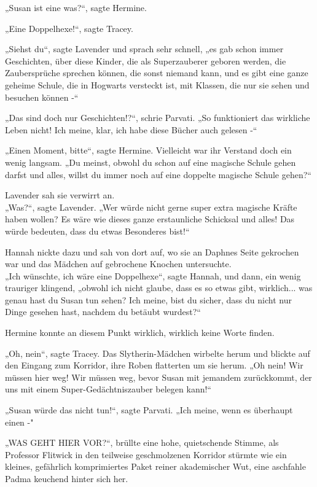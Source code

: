 {„Susan ist eine was?“, sagte Hermine.

„Eine Doppelhexe!“, sagte Tracey.

„Siehst du“, sagte Lavender und sprach sehr schnell, „es gab schon immer Geschichten, über diese Kinder, die als Superzauberer geboren werden, die Zaubersprüche sprechen können, die sonst niemand kann, und es gibt eine ganze geheime Schule, die in Hogwarts versteckt ist, mit Klassen, die nur sie sehen und besuchen können -“

„Das sind doch nur Geschichten!?“, schrie Parvati. „So funktioniert das wirkliche Leben nicht! Ich meine, klar, ich habe diese Bücher auch gelesen -“

„Einen Moment, bitte“, sagte Hermine. Vielleicht war ihr Verstand doch ein wenig langsam. „Du meinst, obwohl du schon auf eine magische Schule gehen darfst und alles, willst du immer noch auf eine doppelte magische Schule gehen?“

Lavender sah sie verwirrt an.\\ „Was?“, sagte Lavender. „Wer würde nicht gerne super extra magische Kräfte haben wollen? Es wäre wie dieses ganze erstaunliche Schicksal und alles! Das würde bedeuten, dass du etwas Besonderes bist!“

Hannah nickte dazu und sah von dort auf, wo sie an Daphnes Seite gekrochen war und das Mädchen auf gebrochene Knochen untersuchte.\\ „Ich wünschte, ich wäre eine Doppelhexe“, sagte Hannah, und dann, ein wenig trauriger klingend, „obwohl ich nicht glaube, dass es so etwas gibt, wirklich... was genau hast du Susan tun sehen? Ich meine, bist du sicher, dass du nicht nur Dinge gesehen hast, nachdem du betäubt wurdest?“

Hermine konnte an diesem Punkt wirklich, wirklich keine Worte finden.

„Oh, nein“, sagte Tracey. Das Slytherin-Mädchen wirbelte herum und blickte auf den Eingang zum Korridor, ihre Roben flatterten um sie herum. „Oh nein! Wir müssen hier weg! Wir müssen weg, bevor Susan mit jemandem zurückkommt, der uns mit einem Super-Gedächtniszauber belegen kann!“

„Susan würde das nicht tun!“, sagte Parvati. „Ich meine, wenn es überhaupt einen -"

„WAS GEHT HIER VOR?“, brüllte eine hohe, quietschende Stimme, als Professor Flitwick in den teilweise geschmolzenen Korridor stürmte wie ein kleines, gefährlich komprimiertes Paket reiner akademischer Wut, eine aschfahle Padma keuchend hinter sich her.

}
